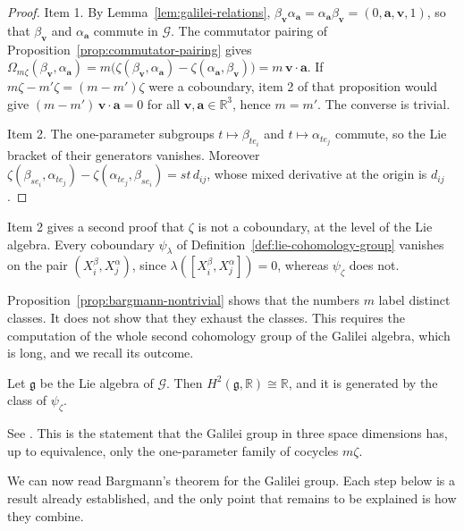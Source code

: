 \begin{proof}
	Item 1. By Lemma~\ref{lem:galilei-relations}, $\beta_{\mathbf{v}}\alpha_{\mathbf{a}}=\alpha_{\mathbf{a}}\beta_{\mathbf{v}}=(0,\mathbf{a},\mathbf{v},1)$, so that $\beta_{\mathbf{v}}$ and $\alpha_{\mathbf{a}}$ commute in $\mathcal{G}$. The commutator pairing of Proposition~\ref{prop:commutator-pairing} gives $\Omega_{m\zeta}(\beta_{\mathbf{v}},\alpha_{\mathbf{a}})=m\big(\zeta(\beta_{\mathbf{v}},\alpha_{\mathbf{a}})-\zeta(\alpha_{\mathbf{a}},\beta_{\mathbf{v}})\big)=m\,\mathbf{v}\cdot\mathbf{a}$. If $m\zeta-m'\zeta=(m-m')\zeta$ were a coboundary, item 2 of that proposition would give $(m-m')\,\mathbf{v}\cdot\mathbf{a}=0$ for all $\mathbf{v},\mathbf{a}\in\mathbb{R}^3$, hence $m=m'$. The converse is trivial.
	
	Item 2. The one-parameter subgroups $t\mapsto\beta_{te_i}$ and $t\mapsto\alpha_{te_j}$ commute, so the Lie bracket of their generators vanishes. Moreover $\zeta(\beta_{se_i},\alpha_{te_j})-\zeta(\alpha_{te_j},\beta_{se_i})=st\,d_{ij}$, whose mixed derivative at the origin is $d_{ij}$.
\end{proof}

\noindent Item 2 gives a second proof that $\zeta$ is not a coboundary, at the level of the Lie algebra. Every coboundary $\psi_\lambda$ of Definition~\ref{def:lie-cohomology-group} vanishes on the pair $(X^\beta_i,X^\alpha_j)$, since $\lambda([X^\beta_i,X^\alpha_j])=0$, whereas $\psi_\zeta$ does not.

Proposition~\ref{prop:bargmann-nontrivial} shows that the numbers $m$ label distinct classes. It does not show that they exhaust the classes. This requires the computation of the whole second cohomology group of the Galilei algebra, which is long, and we recall its outcome.

\begin{proposition}\label{prop:galilei-cohomology}
	Let $\mathfrak{g}$ be the Lie algebra of $\mathcal{G}$. Then $H^2(\mathfrak{g},\mathbb{R})\cong\mathbb{R}$, and it is generated by the class of $\psi_\zeta$.
\end{proposition}

\noindent See \cite[TODO-location]{TODO-Bargmann1954}. This is the statement that the Galilei group in three space dimensions has, up to equivalence, only the one-parameter family of cocycles $m\zeta$.

We can now read Bargmann's theorem for the Galilei group. Each step below is a result already established, and the only point that remains to be explained is how they combine.


